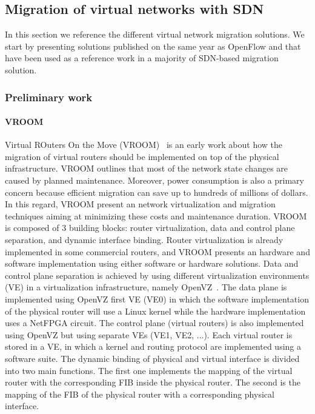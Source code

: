 \subsection{Migration of virtual networks with SDN}
In this section we reference the different virtual network migration solutions.
We start by presenting solutions published on the same year as OpenFlow and that have been used as a reference work in a majority of SDN-based migration solution.

\subsubsection{Preliminary work}

\paragraph{VROOM}
Virtual ROuters On the Move (VROOM)~\cite{VROOM-Wang2008} is an early work about how the migration of virtual routers should be implemented on top of the physical infrastructure. 
VROOM outlines that most of the network state changes are caused by planned maintenance.
Moreover, power consumption is also a primary concern because efficient migration can save up to hundreds of millions of dollars.
In this regard, VROOM present an network virtualization and migration techniques aiming at minimizing these costs and maintenance duration.
VROOM is composed of 3 building blocks: router virtualization, data and control plane separation, and dynamic interface binding.
Router virtualization is already implemented in some commercial routers, and VROOM presents an hardware and software implementation using either software or hardware solutions.
Data and control plane separation is achieved by using different virtualization environments (VE) in a virtualization infrastructure, namely OpenVZ~\cite{openvz}.
The data plane is implemented using OpenVZ first VE (VE0) in which the software implementation of the physical router will use a Linux kernel while the hardware implementation uses a NetFPGA circuit.
The control plane (\ie virtual routers) is also implemented using OpenVZ but using separate VEs (VE1, VE2, ...).
Each virtual router is stored in a VE, in which a kernel and routing protocol are implemented using a software suite.
The dynamic binding of physical and virtual interface is divided into two main functions.
The first one implements the mapping of the virtual router with the corresponding FIB inside the physical router.
The second is the mapping of the FIB of the physical router with a corresponding physical interface.


